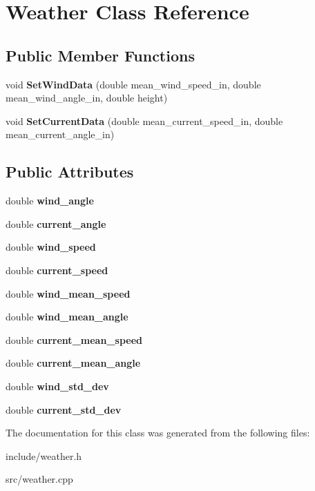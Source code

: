 \section{Weather Class Reference}
\label{class_weather}
\subsection*{Public Member Functions}
\begin{DoxyCompactItemize}
\item 
void {\bfseries Set\+Wind\+Data} (double mean\+\_\+wind\+\_\+speed\+\_\+in, double mean\+\_\+wind\+\_\+angle\+\_\+in, double height)\label{class_weather_a48d1098ede2e0cf3fc61102cb551bc5e}

\item 
void {\bfseries Set\+Current\+Data} (double mean\+\_\+current\+\_\+speed\+\_\+in, double mean\+\_\+current\+\_\+angle\+\_\+in)\label{class_weather_a4b2bc213fef6bf759426f783a0a91aec}

\end{DoxyCompactItemize}
\subsection*{Public Attributes}
\begin{DoxyCompactItemize}
\item 
double {\bfseries wind\+\_\+angle}\label{class_weather_acc253d38bec71dddfb4ae92af380c6e5}

\item 
double {\bfseries current\+\_\+angle}\label{class_weather_ab304533a7f025f1a2f3c112038255110}

\item 
double {\bfseries wind\+\_\+speed}\label{class_weather_a3bf8124bffb9977bb431cca94a9dcc6e}

\item 
double {\bfseries current\+\_\+speed}\label{class_weather_a850d28701912b9ab5c38dbe25ceb4374}

\item 
double {\bfseries wind\+\_\+mean\+\_\+speed}\label{class_weather_a16c656d234ae82390ae3d6b0b2c3d25f}

\item 
double {\bfseries wind\+\_\+mean\+\_\+angle}\label{class_weather_a9ba4efa510c11bd8d9ea841a8f59597e}

\item 
double {\bfseries current\+\_\+mean\+\_\+speed}\label{class_weather_ae7433f63d352a8716e954553090b0b03}

\item 
double {\bfseries current\+\_\+mean\+\_\+angle}\label{class_weather_a9df9824cd69668a46db8ee9c15e9d843}

\item 
double {\bfseries wind\+\_\+std\+\_\+dev}\label{class_weather_a42a7e1a8cd76e584e40b9e8f40ba5fb2}

\item 
double {\bfseries current\+\_\+std\+\_\+dev}\label{class_weather_ad10c40b130367299a700e43c716ba991}

\end{DoxyCompactItemize}


The documentation for this class was generated from the following files\+:\begin{DoxyCompactItemize}
\item 
include/weather.\+h\item 
src/weather.\+cpp\end{DoxyCompactItemize}
